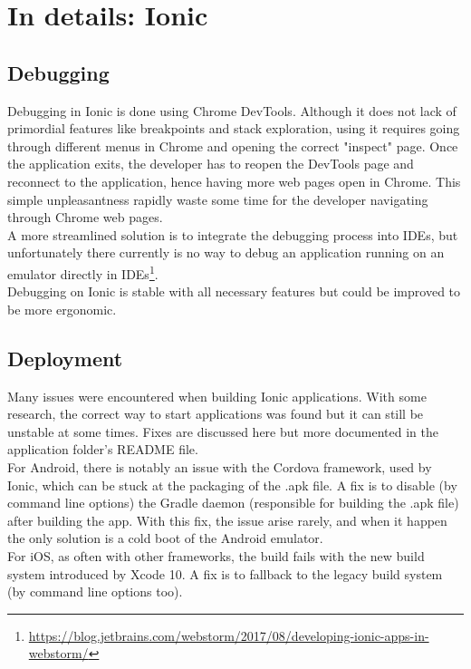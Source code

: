 \documentclass[11pt, a4paper, twoside, openright]{article} %
\begin{document}
{\section{In details: Ionic}
\subsection{Debugging}
\label{sub:appendix_ionic_debugging}
Debugging in Ionic is done using Chrome DevTools. Although it does not lack of primordial features like breakpoints and stack exploration, using it requires going through different menus in Chrome and opening the correct "inspect" page. Once the application exits, the developer has to reopen the DevTools page and reconnect to the application, hence having more web pages open in Chrome. This simple unpleasantness rapidly waste some time for the developer navigating through Chrome web pages. \\
A more streamlined solution is to integrate the debugging process into IDEs, but unfortunately there currently is no way to debug an application running on an emulator directly in IDEs\footnote{\url{https://blog.jetbrains.com/webstorm/2017/08/developing-ionic-apps-in-webstorm/}}. \\
Debugging on Ionic is stable with all necessary features but could be improved to be more ergonomic.


\subsection{Deployment}
\label{sub:appendix_ionic_deployment}
Many issues were encountered when building Ionic applications. With some research, the correct way to start applications was found but it can still be unstable at some times. Fixes are discussed here but more documented in the application folder's README file.\\

For Android, there is notably an issue with the Cordova framework, used by Ionic, which can be stuck at the packaging of the .apk file. A fix is to disable (by command line options) the Gradle daemon (responsible for building the .apk file) after building the app. With this fix, the issue arise rarely, and when it happen the only solution is a cold boot of the Android emulator.\\
For iOS, as often with other frameworks, the build fails with the new build system introduced by Xcode 10. A fix is to fallback to the legacy build system (by command line options too). \\

}
\end{document}

